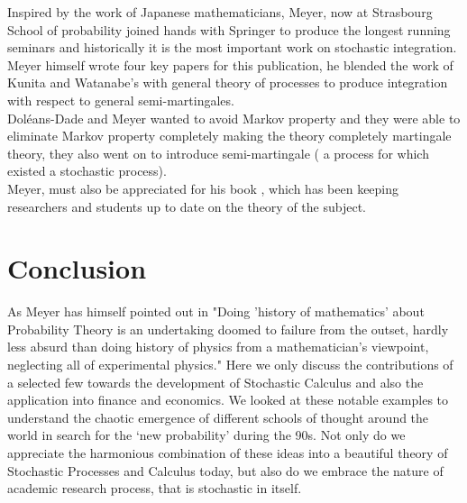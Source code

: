 \documentclass{article}
\begin{document}
Inspired by the work of Japanese mathematicians, Meyer, now at  Strasbourg School of probability joined hands with Springer to produce the longest running seminars and historically it is the most important work on stochastic integration.  Meyer himself wrote four key papers for this publication, he blended the work of Kunita and Watanabe's with general theory of processes to produce  integration with respect to general semi-martingales.  \\

Dol\'{e}ans-Dade and Meyer \cite{Mey10} wanted to avoid Markov property and they were able to eliminate Markov property completely making the theory completely martingale theory, they also went on to introduce semi-martingale ( a process for which existed a stochastic process). \\

Meyer, must also be appreciated for his book \cite{Mey9}, which has been keeping researchers and students up to date on the theory of the subject.


\section{Conclusion}

As Meyer has himself pointed out in \cite{Mey5} "Doing 'history of mathematics' about Probability Theory is an undertaking doomed to failure from the outset, hardly less absurd than doing history of physics from a mathematician's viewpoint, neglecting all of experimental physics." Here we only discuss the contributions of a selected few towards the development of Stochastic Calculus and also the application into finance and economics. We looked at these notable examples to understand the chaotic emergence of different schools of thought around the world in search for the ‘new probability’ during the 90s. Not only do we appreciate the harmonious combination of these ideas into a beautiful theory of Stochastic Processes and Calculus today, but also do we embrace the nature of academic research process, that is stochastic in itself.

\newpage
\section*{} \label{bibsection}
\end{document}
